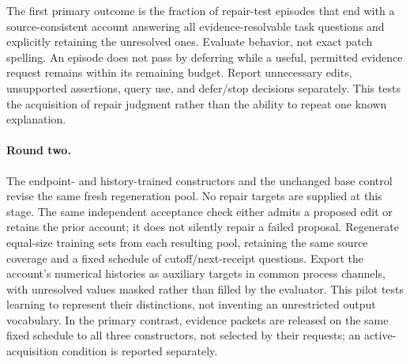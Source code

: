 \documentclass[10pt]{article}
\begin{document}
The first primary outcome is the fraction of repair-test episodes that end
with a source-consistent account answering all evidence-resolvable task
questions and explicitly retaining the unresolved ones. Evaluate behavior,
not exact patch spelling. An episode does not pass by deferring while a useful,
permitted evidence request remains within its remaining budget. Report unnecessary edits, unsupported assertions,
query use, and defer/stop decisions separately. This tests the acquisition of
repair judgment rather than the ability to repeat one known explanation.

\paragraph{Round two.}
The endpoint- and history-trained constructors and the unchanged
base control revise the same fresh regeneration pool. No repair targets are supplied at this stage. The
same independent acceptance check either admits a proposed edit or retains
the prior account; it does not silently repair a failed proposal. Regenerate
equal-size training sets from each resulting pool, retaining the same source
coverage and a fixed schedule of cutoff/next-receipt questions. Export the
account's numerical histories as auxiliary targets in common process
channels, with unresolved values masked rather than filled by the evaluator. This
pilot tests learning to represent their distinctions, not inventing an
unrestricted output vocabulary. In the primary contrast, evidence packets are
released on the same fixed schedule to all three constructors, not selected by
their requests; an active-acquisition condition is reported separately.
\end{document}
